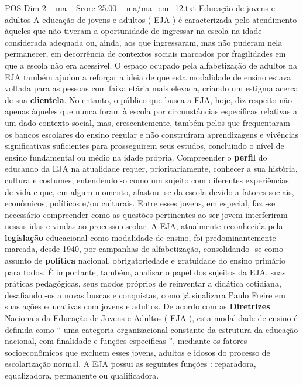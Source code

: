 \begin{textsample}{POS Dim 2 – ma – Score 25.00 – ma/ma\_em\_12.txt}  \label{ex:f2_pos_060}
Educação de jovens e adultos A educação de jovens e adultos ( EJA ) é caracterizada pelo atendimento àqueles que não tiveram a oportunidade de ingressar na escola na idade considerada adequada ou, ainda, aos que ingressaram, mas não puderam nela permanecer, em decorrência de contextos sociais marcados por fragilidades em que a escola não era acessível.
O espaço ocupado pela alfabetização de adultos na EJA também ajudou a reforçar a ideia de que esta modalidade de ensino estava voltada para as pessoas com faixa etária mais elevada, criando um estigma acerca de sua \textbf{clientela}.
No entanto, o público que busca a EJA, hoje, diz respeito não apenas àqueles que nunca foram à escola por circunstâncias específicas relativas a um dado contexto social, mas, crescentemente, também pelos que frequentaram os bancos escolares do ensino regular e não construíram aprendizagens e vivências significativas suficientes para prosseguirem seus estudos, concluindo o nível de ensino fundamental ou médio na idade própria.
Compreender o \textbf{perfil} do educando da EJA na atualidade requer, prioritariamente, conhecer a sua história, cultura e costumes, entendendo -o como um sujeito com diferentes experiências de vida e que, em algum momento, afastou -se da escola devido a fatores sociais, econômicos, políticos e/ou culturais.
Entre esses jovens, em especial, faz -se necessário compreender como as questões pertinentes ao ser jovem interferiram nessas idas e vindas ao processo escolar.
A EJA, atualmente reconhecida pela \textbf{legislação} educacional como modalidade de ensino, foi predominantemente marcada, desde 1940, por campanhas de alfabetização, consolidando -se como assunto de \textbf{política} nacional, obrigatoriedade e gratuidade do ensino primário para todos.
É importante, também, analisar o papel dos sujeitos da EJA, suas práticas pedagógicas, seus modos próprios de reinventar a didática cotidiana, desafiando -os a novas buscas e conquistas, como já sinalizara Paulo Freire em suas ações educativas com jovens e adultos.
De acordo com as \textbf{Diretrizes} Nacionais da Educação de Jovens e Adultos ( EJA ), esta modalidade de ensino é definida como “ uma categoria organizacional constante da estrutura da educação nacional, com finalidade e funções específicas ”, mediante os fatores socioeconômicos que excluem esses jovens, adultos e idosos do processo de escolarização normal.
A EJA possui as seguintes funções : reparadora, equalizadora, permanente ou qualificadora.

\end{textsample}
